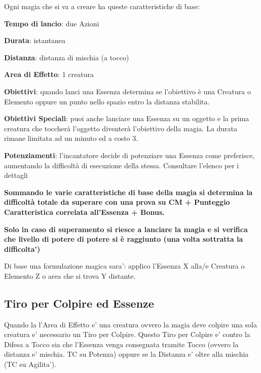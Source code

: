 \documentclass[a4paper,11pt,twoside,openany]{book}
\begin{document}
\label{caratteristiche-base-delle-essenze}

Ogni magia che si va a creare ha queste caratteristiche di base:

\smallskip

\textbf{Tempo di lancio}: due Azioni

\textbf{Durata}: istantanea

\textbf{Distanza}: distanza di mischia (a tocco)

\textbf{Area di Effetto}: 1 creatura 

\textbf{Obiettivi}: quando lanci una Essenza determina se l'obiettivo è una Creatura o Elemento oppure un punto nello spazio entro la distanza stabilita.

\textbf{Obiettivi Speciali}: puoi anche lanciare una Essenza su un oggetto e la prima creatura che toccherà l'oggetto diventerà l'obiettivo della magia. La durata rimane limitata ad un minuto ed a costo 3.

\textbf{Potenziamenti}: l'incantatore decide di potenziare una Essenza come preferisce, aumentando la difficoltà di esecuzione della stessa. Consultare l'elenco per i dettagli

\textbf{Sommando le varie caratteristiche di base della magia si determina la difficoltà totale da superare con una prova su CM + Punteggio Caratteristica correlata all'Essenza + Bonus.}

\textbf{Solo in caso di superamento si riesce a lanciare la magia e si verifica che livello di potere di potere si è raggiunto (una volta sottratta la difficolta')}

Di base una formulazione magica sara': applico l'Essenza X alla/e Creatura o Elemento Z o area che si trova Y distante.

\subsection{Tiro per Colpire ed Essenze}

Quando la l'Area di Effetto e' una creatura ovvero la magia deve colpire una sola creatura e' necessario un Tiro per Colpire.
Questo Tiro per Colpire e' contro la Difesa a Tocco sia che l'Essenza venga consegnata tramite Tocco (ovvero la distanza e' mischia. TC su Potenza) oppure se la Distanza e' oltre alla mischia (TC su Agilita').
\end{document}
